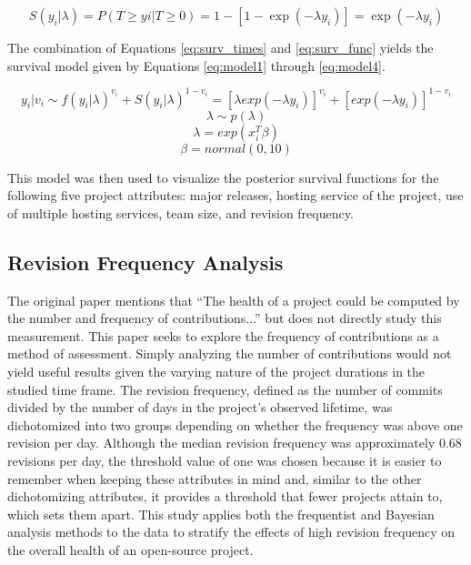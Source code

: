 \documentclass[sigconf]{acmart}
\begin{document}
\begin{equation} \label{eq:surv_func}
    S(y_i|\lambda) = P(T \geq yi|T \geq 0) = 1 - [1 - \exp(-  \lambda y_i)] = \exp(- \lambda y_i)
\end{equation}

The combination of Equations \ref{eq:surv_times} and \ref{eq:surv_func} yields the survival model given by Equations \ref{eq:model1} through \ref{eq:model4}.

\begin{equation} \label{eq:model1}
    y_i|v_i \sim f(y_i| \lambda)^{v_i} + S(y_i| \lambda)^{1-v_i} = [\lambda exp(-  \lambda y_i)]^{v_i} + [exp(-  \lambda y_i)]^{1-v_i}
\end{equation}
\begin{equation} \label{eq:model2}
    \lambda \sim p(\lambda)
\end{equation}
\begin{equation} \label{eq:model3}
    \lambda = exp(x_i^T \beta)
\end{equation}
\begin{equation} \label{eq:model4}
    \beta = normal(0, 10)
\end{equation}

This model was then used to visualize the posterior survival functions for the following five project attributes: major releases, hosting service of the project, use of multiple hosting services, team size, and revision frequency. 

\subsection{Revision Frequency Analysis} \label{revisionFreq}

The original paper mentions that ``The health of a project could be computed by the number and frequency of contributions...'' \cite{ali2020cheating} but does not directly study this measurement.
This paper seeks to explore the frequency of contributions as a method of assessment. 
Simply analyzing the number of contributions would not yield useful results given the varying nature of the project durations in the studied time frame. 
The revision frequency, defined as the number of commits divided by the number of days in the project's observed lifetime, was dichotomized into two groups depending on whether the frequency was above one revision per day.
Although the median revision frequency was approximately 0.68 revisions per day, the threshold value of one was chosen because it is easier to remember when keeping these attributes in mind and, similar to the other dichotomizing attributes, it provides a threshold that fewer projects attain to, which sets them apart.
This study applies both the frequentist and Bayesian analysis methods to the data to stratify the effects of high revision frequency on the overall health of an open-source project.
\end{document}
